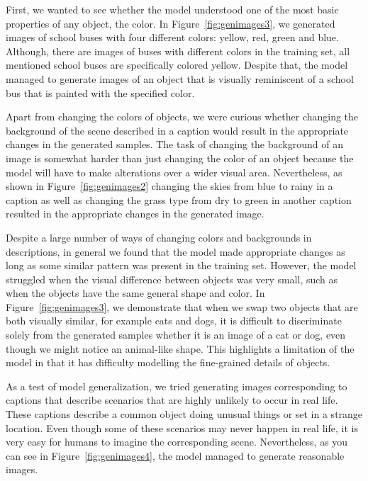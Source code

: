 \documentclass{article} %
\begin{document}
First, we wanted to see whether the model understood one of the most basic properties of any object, the color. In Figure~\ref{fig:genimages3}, we generated images of school buses with four different colors: yellow, red, green and blue. Although, there are images of buses with different colors in the training set, all mentioned school buses are specifically colored yellow. Despite that, the model managed to generate images of an object that is visually reminiscent of a school bus that is painted with the specified color.

Apart from changing the colors of objects, we were curious whether changing the background of the scene described in a caption would result in the appropriate changes in the generated samples. The task of changing the background of an image is somewhat harder than just changing the color of an object because the model will have to make alterations over a wider visual area. Nevertheless, as shown in Figure~\ref{fig:genimages2} changing the skies from blue to rainy in a caption as well as changing the grass type from dry to green in another caption resulted in the appropriate changes in the generated image.

Despite a large number of ways of changing colors and backgrounds in descriptions, in general we found that the model made appropriate changes as long as some similar pattern was present in the training set. However, the model struggled when the visual difference between objects was very small, such as when the objects have the same general shape and color. In Figure~\ref{fig:genimages3}, we demonstrate that when we swap two objects that are both visually similar, for example cats and dogs, it is difficult to discriminate solely from the generated samples whether it is an image of a cat or dog, even though we might notice an animal-like shape. This highlights a limitation of the model in that it has difficulty modelling the fine-grained details of objects.

As a test of model generalization, we tried generating images corresponding to captions that describe scenarios that are highly unlikely to occur in real life. These captions describe a common object doing unusual things 
or set in a strange location.
Even though some of these scenarios may never happen in real life, it is very easy for humans to imagine the corresponding scene. Nevertheless, as you can see in Figure~\ref{fig:genimages4}, the model managed to generate reasonable images.  
\end{document}
